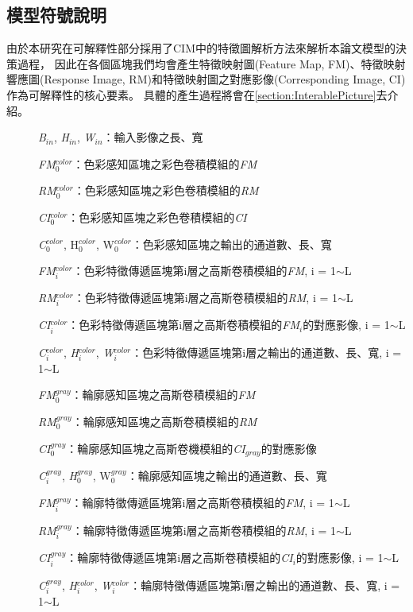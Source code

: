 \documentclass[class=NCU_thesis, crop=false]{standalone}
\begin{document}
\subsection{模型符號說明}
	由於本研究在可解釋性部分採用了CIM中的特徵圖解析方法來解析本論文模型的決策過程，
	因此在各個區塊我們均會產生特徵映射圖(Feature Map, FM)、特徵映射響應圖(Response Image, RM)和特徵映射圖之對應影像(Corresponding Image, CI)作為可解釋性的核心要素。
	具體的產生過程將會在\cref{section:InterablePicture}去介紹。

	\begin{description}
		\item[]\textit{B}$_{in}$, \textit{H}$_{in}$, \textit{W}$_{in}$：輸入影像之長、寬

		\item[]\textit{FM}$^{color}_{0}$：色彩感知區塊之彩色卷積模組的\textit{FM}
		\item[]\textit{RM}$^{color}_{0}$：色彩感知區塊之彩色卷積模組的\textit{RM}
		\item[]\textit{CI}$^{color}_{0}$：色彩感知區塊之彩色卷積模組的\textit{CI}
		\item[]\textit{C}$^{color}_{0}$, {H}$^{color}_{0}$, {W}$^{color}_{0}$：色彩感知區塊之輸出的通道數、長、寬

		\item[]\textit{FM}$^{color}_{i}$：色彩特徵傳遞區塊第i層之高斯卷積模組的\textit{FM}, i = 1$\sim$L
		\item[]\textit{RM}$^{color}_{i}$：色彩特徵傳遞區塊第i層之高斯卷積模組的\textit{RM}, i = 1$\sim$L
		\item[]\textit{CI}$^{color}_{i}$：色彩特徵傳遞區塊第i層之高斯卷積模組的\textit{FM}$_{i}$的對應影像, i = 1$\sim$L
		\item[]\textit{C}$^{color}_{i}$, \textit{H}$^{color}_{i}$, \textit{W}$^{color}_{i}$：色彩特徵傳遞區塊第i層之輸出的通道數、長、寬, i = 1$\sim$L
		
		\item[]\textit{FM}$^{gray}_{0}$：輪廓感知區塊之高斯卷積模組的\textit{FM}
		\item[]\textit{RM}$^{gray}_{0}$：輪廓感知區塊之高斯卷積模組的\textit{RM}
		\item[]\textit{CI}$^{gray}_{0}$：輪廓感知區塊之高斯卷機模組的\textit{CI}$_{gray}$的對應影像
		\item[]\textit{C}$^{gray}_{i}$, \textit{H}$^{gray}_{0}$, {W}$^{gray}_{0}$：輪廓感知區塊之輸出的通道數、長、寬

		\item[]\textit{FM}$^{gray}_{i}$：輪廓特徵傳遞區塊第i層之高斯卷積模組的\textit{FM}, i = 1$\sim$L
		\item[]\textit{RM}$^{gray}_{i}$：輪廓特徵傳遞區塊第i層之高斯卷積模組的\textit{RM}, i = 1$\sim$L
		\item[]\textit{CI}$^{gray}_{i}$：輪廓特徵傳遞區塊第i層之高斯卷積模組的\textit{CI}$_{i}$的對應影像, i = 1$\sim$L
		\item[]\textit{C}$^{gray}_{i}$, \textit{H}$^{color}_{i}$, \textit{W}$^{color}_{i}$：輪廓特徵傳遞區塊第i層之輸出的通道數、長、寬, i = 1$\sim$L



\end{description}
\end{document}

